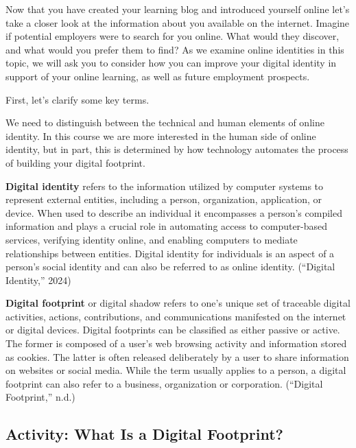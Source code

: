 \documentclass[
  letterpaper,
  DIV=11,
  numbers=noendperiod]{scrreprt}
\begin{document}
Now that you have created your learning blog and introduced yourself
online let's take a closer look at the information about you available
on the internet. Imagine if potential employers were to search for you
online. What would they discover, and what would you prefer them to
find? As we examine online identities in this topic, we will ask you to
consider how you can improve your digital identity in support of your
online learning, as well as future employment prospects.

First, let's clarify some key terms.

We need to distinguish between the technical and human elements of
online identity. In this course we are more interested in the human side
of online identity, but in part, this is determined by how technology
automates the process of building your digital footprint.

\textbf{Digital identity} refers to the information utilized by computer
systems to represent external entities, including a person,
organization, application, or device. When used to describe an
individual it encompasses a person's compiled information and plays a
crucial role in automating access to computer-based services, verifying
identity online, and enabling computers to mediate relationships between
entities. Digital identity for individuals is an aspect of a person's
social identity and can also be referred to as online identity.
(``Digital Identity,'' 2024)

\textbf{Digital footprint} or digital shadow refers to one's unique set
of traceable digital activities, actions, contributions, and
communications manifested on the internet or digital devices. Digital
footprints can be classified as either passive or active. The former is
composed of a user's web browsing activity and information stored as
cookies. The latter is often released deliberately by a user to share
information on websites or social media. While the term usually applies
to a person, a digital footprint can also refer to a business,
organization or corporation. (``Digital Footprint,'' n.d.)

\subsection{Activity: What Is a Digital
Footprint?}\label{activity-what-is-a-digital-footprint}
\end{document}

